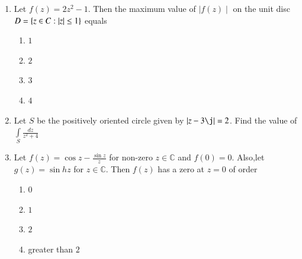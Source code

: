 \documentclass[journal,12pt,twocolumn]{IEEEtran}
\begin{document}
\begin{enumerate}[1.]
\begin{enumerate}
\end{enumerate}

\item Let $f(z)=2z^2-1$. Then the maximum value of $ \mid f(z) \mid $ on the unit disc 
$ D= \lbrace z \in C :  \left\vert z\right\vert \leq 1 \rbrace $ equals 


\begin{enumerate}

\item $
1
$

\item $
2
$

\item $
3
$

\item $
4
$

\end{enumerate} 


\item Let $S$ be the positively oriented circle given by $  \abs{z- 3 \j} =2 $. Find the value of 
$\int\limits_{S} \frac{dz}{z^2+4} $ 


%
%
%
%
%
%
%
%




\item Let $f(z) = \cos z - \frac{\sin z}{z} $ for non-zero $z \in \mathbb{C}$ and $f(0)=0$. Also,let $g(z)=\sin hz $ for $z \in \mathbb{C}$. Then $f(z)$ has a zero at $z=0$ of order

\begin{enumerate}

\item $
0
$

\item $
1
$

\item $
2
$

\item 
greater than $2$


\end{enumerate}


\end{enumerate}
\end{document}
